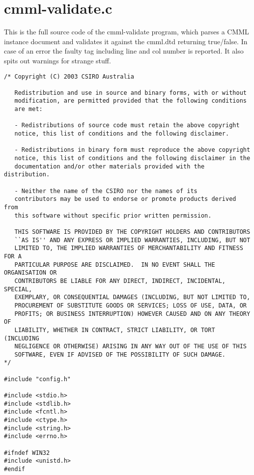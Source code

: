 \section{cmml-validate.c}
This is the full source code of the cmml-validate program, which parses a CMML instance document and validates it against the cmml.dtd returning true/false. In case of an error the faulty tag including line and col number is reported. It also spits out warnings for strange stuff. 

\footnotesize\begin{verbatim}/* Copyright (C) 2003 CSIRO Australia

   Redistribution and use in source and binary forms, with or without
   modification, are permitted provided that the following conditions
   are met:
   
   - Redistributions of source code must retain the above copyright
   notice, this list of conditions and the following disclaimer.
   
   - Redistributions in binary form must reproduce the above copyright
   notice, this list of conditions and the following disclaimer in the
   documentation and/or other materials provided with the distribution.
   
   - Neither the name of the CSIRO nor the names of its
   contributors may be used to endorse or promote products derived from
   this software without specific prior written permission.
   
   THIS SOFTWARE IS PROVIDED BY THE COPYRIGHT HOLDERS AND CONTRIBUTORS
   ``AS IS'' AND ANY EXPRESS OR IMPLIED WARRANTIES, INCLUDING, BUT NOT
   LIMITED TO, THE IMPLIED WARRANTIES OF MERCHANTABILITY AND FITNESS FOR A
   PARTICULAR PURPOSE ARE DISCLAIMED.  IN NO EVENT SHALL THE ORGANISATION OR
   CONTRIBUTORS BE LIABLE FOR ANY DIRECT, INDIRECT, INCIDENTAL, SPECIAL,
   EXEMPLARY, OR CONSEQUENTIAL DAMAGES (INCLUDING, BUT NOT LIMITED TO,
   PROCUREMENT OF SUBSTITUTE GOODS OR SERVICES; LOSS OF USE, DATA, OR
   PROFITS; OR BUSINESS INTERRUPTION) HOWEVER CAUSED AND ON ANY THEORY OF
   LIABILITY, WHETHER IN CONTRACT, STRICT LIABILITY, OR TORT (INCLUDING
   NEGLIGENCE OR OTHERWISE) ARISING IN ANY WAY OUT OF THE USE OF THIS
   SOFTWARE, EVEN IF ADVISED OF THE POSSIBILITY OF SUCH DAMAGE.
*/

#include "config.h"

#include <stdio.h>
#include <stdlib.h>
#include <fcntl.h>
#include <ctype.h>
#include <string.h>
#include <errno.h>

#ifndef WIN32
#include <unistd.h>
#endif


\end{verbatim}
